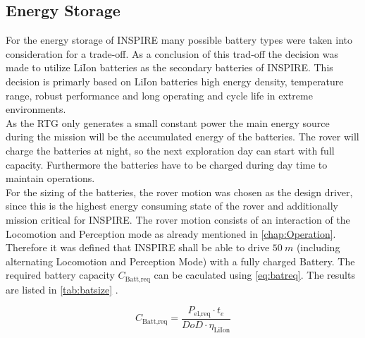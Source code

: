 \subsection{Energy Storage} 
For the energy storage of INSPIRE many possible battery types were taken into consideration for a trade-off. As a conclusion of this trad-off the decision was made to utilize LiIon batteries as the secondary batteries of INSPIRE. This decision is primarly based on LiIon batteries high energy density, temperature range, robust performance and long operating and cycle life in extreme environments\cite{IRSatUniversityofStuttgart.2020}. \\
As the RTG only generates a small constant power the main energy source during the mission will be the accumulated energy of the batteries. The rover will charge the batteries at night, so the next exploration day can start with full capacity. Furthermore the batteries have to be charged during day time to maintain operations.\\
For the sizing of the batteries, the rover motion was chosen as the design driver, since this is the highest energy consuming state of the rover and additionally mission critical for INSPIRE. The rover motion consists of an interaction of the Locomotion and Perception mode as already mentioned in \autoref{chap:Operation}. Therefore it was defined that INSPIRE shall be able to drive $ 50 \ m $ (including alternating Locomotion and Perception Mode) with a fully charged Battery. The required battery capacity $C_\text{Batt,req}$ can be caculated using \autoref{eq:batreq}. The results are listed in \autoref{tab:batsize} \cite{S.Klinkner.2021}.


\begin{equation}
C_\text{Batt,req} = \frac{P_\text{el,req} \cdot t_e }{DoD \cdot \eta_\text{LiIon}}
\label{eq:batreq}
\end{equation}

